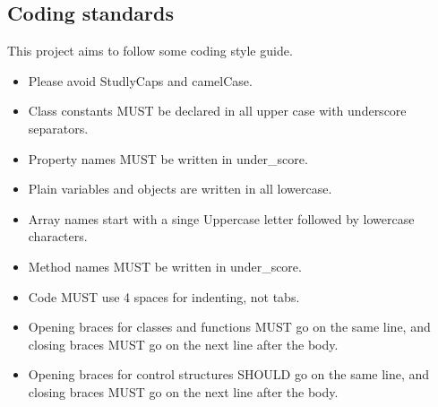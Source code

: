 \subsection{Coding standards}
This project aims to follow some coding style guide.
\begin{itemize}
\item Please avoid StudlyCaps and camelCase.
\item Class constants MUST be declared in all upper case with underscore separators.
\item Property names MUST be written in under{\_}score.
\item Plain variables and objects are written in all lowercase.
\item Array names start with a singe Uppercase letter followed by lowercase characters.
\item Method names MUST be written in under{\_}score.

\item Code MUST use 4 spaces for indenting, not tabs.
\item Opening braces for classes and functions MUST go on the same line, and closing braces MUST go on the next line after the body.
\item Opening braces for control structures SHOULD go on the same line, and closing
braces MUST go on the next line after the body.
\end{itemize}

